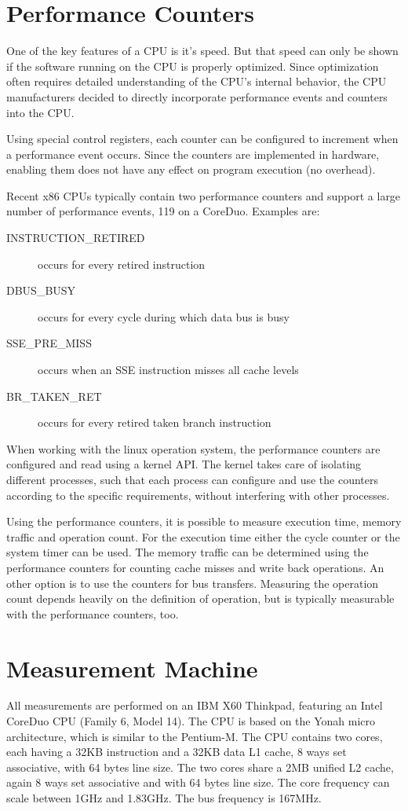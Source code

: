 \documentclass[a4paper,12pt]{report}
\begin{document}
\section{Performance Counters}
One of the key features of a CPU is it's speed. But that speed can only be
shown if the software running on the CPU is properly optimized. Since
optimization often requires detailed understanding of the CPU's internal
behavior, the CPU manufacturers decided to directly incorporate performance
events and counters into the CPU. 

Using special control registers, each counter can be configured to increment
when a performance event occurs. Since the counters are implemented in hardware,
enabling them does not have any effect on program execution (no overhead). 

Recent x86 CPUs typically contain two performance counters and support a large
number of performance events, 119 on a CoreDuo. Examples are:
\begin{description}
  \item[INSTRUCTION\_RETIRED] occurs for every retired instruction
  \item[DBUS\_BUSY] occurs for every cycle during which data bus is busy
  \item[SSE\_PRE\_MISS] occurs when an SSE instruction misses all cache levels
  \item[BR\_TAKEN\_RET] occurs for every retired taken branch instruction 
\end{description}

When working with the linux operation system, the performance counters are
configured and read using a kernel API. The kernel takes care of isolating
different processes, such that each process can configure and use the counters
according to the specific requirements, without interfering with other processes.

Using the performance counters, it is possible to measure execution time, memory
traffic and operation count. For the execution time either the cycle counter or
the system timer can be used. The memory traffic can be determined using the
performance counters for counting cache misses and write back operations. An
other option is to use the counters for bus transfers. Measuring the operation count
depends heavily on the definition of operation, but is typically measurable with
the performance counters, too.

\section{Measurement Machine}
\label{sec:MeasurementMachine}
All measurements are performed on an IBM X60 Thinkpad, featuring an Intel
CoreDuo CPU (Family 6, Model 14). The CPU is based on the Yonah
micro architecture, which is similar to the Pentium-M. The CPU contains two
cores, each having a 32KB instruction and a 32KB data L1 cache, 8 ways set associative,
with 64 bytes line size. The two cores share a 2MB unified L2 cache, again 8
ways set associative and with 64 bytes line size. The core frequency can scale
between 1GHz and 1.83GHz. The bus frequency is 167MHz. 
\end{document}
